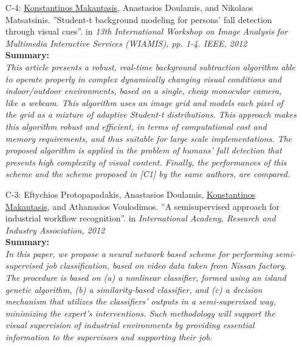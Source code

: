\documentclass[a4paper,10pt]{article}
\begin{document}
\begin{itemize}
	\item [C-4:]\underline{Konstantinos Makantasis}, Anastasios Doulamis, and Nikolaos Matsatsinis. ''Student-t background modeling for persons’ fall detection through visual cues''. in \textit{13th International Workshop on Image Analysis for Multimedia Interactive Services (WIAMIS), pp. 1-4. IEEE, 2012}\\
	\textbf{Summary:}\\
	\textit{This article presents a robust, real-time background subtraction algorithm able to operate properly in complex dynamically changing visual conditions and indoor/outdoor environments, based on a single, cheap monocular camera, like a webcam. This algorithm uses an image grid and models each pixel of the grid as a mixture of adaptive Student-t distributions. This approach makes this algorithm robust and efficient, in terms of computational cost and memory requirements, and thus suitable for large scale implementations. The proposed algorithm is applied in the problem of humans' fall detection that presents high complexity of visual content. Finally, the performances of this scheme and the scheme proposed in [C1] by the same authors, are compared.}
	
	\item [C-3:]Eftychios Protopapadakis, Anastasios Doulamis, \underline{Konstantinos Makantasis}, and Athanasios Voulodimos. ''A semisupervised approach for industrial workflow recognition''. in \textit{International Acadeny, Research and Industry Association, 2012}\\
	\textbf{Summary:}\\
	\textit{In this paper, we propose a neural network based scheme for performing semi-supervised job classification, based on video data taken from Nissan factory. The procedure is based on (a) a nonlinear classifier, formed using an island genetic algorithm, (b) a similarity-based classifier, and (c) a decision mechanism that utilizes the classifiers’ outputs in a semi-supervised way, minimizing the expert’s interventions. Such methodology will support the visual supervision of industrial environments by providing essential information to the supervisors and supporting their job.}
	

\end{itemize}
\end{document}
